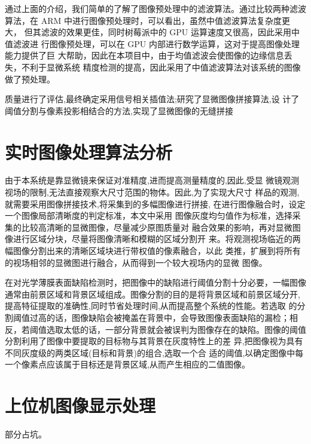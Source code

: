 通过上面的介绍，我们简单的了解了图像预处理中的滤波算法。通过比较两种滤波算法，在 ARM 中进行图像预处理时，可以看出，虽然中值滤波算法复杂度更大， 但其滤波的效果更佳，同时树莓派中的 GPU 运算速度又很高，因此采用中值滤波进 行图像预处理，可以在 GPU 内部进行数学运算，这对于提高图像处理能力提供了巨 大帮助，因此在本项目中，由于均值滤波会使图像的边缘信息丢失，不利于显微系统 精度检测的提高，因此采用了中值滤波算法对该系统的图像做了预处理。




质量进行了评估,最终确定采用信号相关插值法;研究了显微图像拼接算法,设
计了阈值分割与像素投影相结合的方法,实现了显微图像的无缝拼接
\section{实时图像处理算法分析}
由于本系统是靠显微镜来保证对准精度,进而提高测量精度的,因此,受显
微镜观测视场的限制,无法直接观察大尺寸范围的物体。因此,为了实现大尺寸
样品的观测,就需要采用图像拼接技术,将采集到的多幅图像进行拼接,
在进行图像融合时，设定一个图像局部清晰度的判定标准，本文中采用 图像灰度均匀值作为标准，选择采集的比较高清晰的显微图像，尽量减少原图质量对 融合效果的影响，再对显微图像进行区域分块，尽量将图像清晰和模糊的区域分割开 来。将观测视场临近的两幅图像分割出来的清晰区域块进行带权值的像素融合，以此 类推，扩展到将所有的视场相邻的显微图进行融合，从而得到一个较大视场内的显微 图像。 \cite{fastprocessing}

在对光学薄膜表面缺陷检测时，把图像中的缺陷进行阈值分割十分必要，一幅图像通常由前景区域和背景区域组成。图像分割的目的是将背景区域和前景区域分开,提高特征提取的准确性,同时节省处理时间,从而提高整个系统的性能。若选取
的分割阈值过高的话，图像缺陷会被掩盖在背景中，会导致图像表面缺陷的漏检；相 反，若阈值选取太低的话，一部分背景就会被误判为图像存在的缺陷。图像的阈值分割利用了图像中要提取的目标物与其背景在灰度特性上的差
异,把图像视为具有不同灰度级的两类区域(目标和背景)的组合,选取一个合
适的阈值,以确定图像中每一个像素点应该属于目标还是背景区域,从而产生相应的二值图像。



\section{上位机图像显示处理}
部分占坑。\cite{raspnet}

